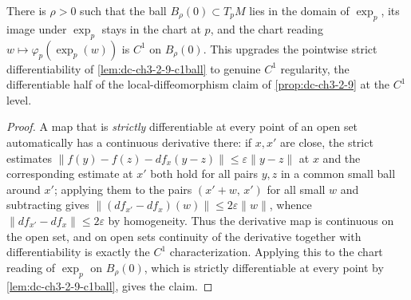 \begin{lemma}
  \label{lem:dc-ch3-2-9-c1}
  \leanok
  There is $\rho > 0$ such that the ball $B_\rho(0) \subset T_pM$ lies in the
  domain of $\exp_p$, its image under $\exp_p$ stays in the chart at $p$, and
  the chart reading $w \mapsto \varphi_p(\exp_p(w))$ is $C^1$ on $B_\rho(0)$.
  This upgrades the pointwise strict differentiability of
  \cref{lem:dc-ch3-2-9-c1ball} to genuine $C^1$ regularity, the differentiable
  half of the local-diffeomorphism claim of \cref{prop:dc-ch3-2-9} at the
  $C^1$ level.
\end{lemma}
\begin{proof}
  \sketch
  \leanok
  A map that is \emph{strictly} differentiable at every point of an open set
  automatically has a continuous derivative there: if $x, x'$ are close, the
  strict estimates
  $\|f(y) - f(z) - df_x(y - z)\| \le \varepsilon \|y - z\|$ at $x$ and the
  corresponding estimate at $x'$ both hold for all pairs $y, z$ in a common
  small ball around $x'$; applying them to the pairs $(x' + w,\, x')$ for all
  small $w$ and subtracting gives
  $\|(df_{x'} - df_x)(w)\| \le 2\varepsilon \|w\|$, whence
  $\|df_{x'} - df_x\| \le 2\varepsilon$ by homogeneity. Thus the derivative
  map is continuous on the open set, and on open sets continuity of the
  derivative together with differentiability is exactly the $C^1$
  characterization. Applying this to the chart reading of $\exp_p$ on
  $B_\rho(0)$, which is strictly differentiable at every point by
  \cref{lem:dc-ch3-2-9-c1ball}, gives the claim.
\end{proof}

